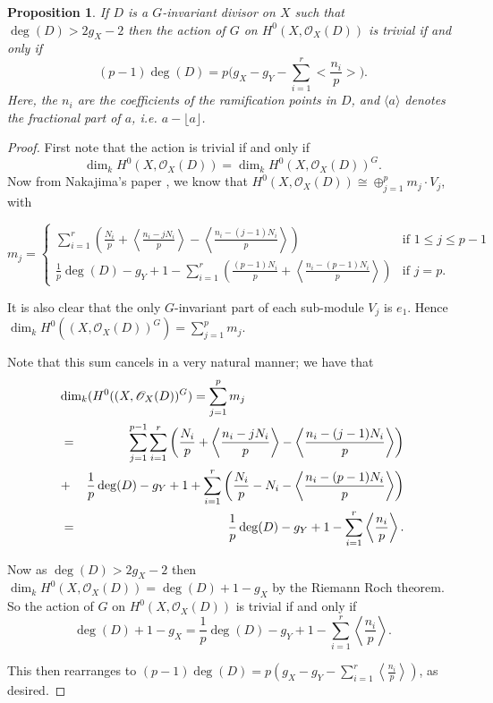 \documentclass[11pt]{article} %
\newtheorem{prop}{Proposition}
\begin{document}
  \begin{prop}\label{nakaj}
    If $D$ is a $G$-invariant divisor on $X$ such that $\deg(D)>2g_X-2$ then the action of $G$ on $H^0(X,\mathscr{O}_X(D))$ is trivial if and only if
      \[ 
	(p-1)\deg(D)=p\Big(g_X-g_Y-\sum_{i=1}^r\Big<\frac{n_i}{p}\Big>\Big).
      \]
    Here, the $n_i$ are the coefficients of the ramification points in $D$, and $\langle a \rangle$ denotes the fractional part of $a$, i.e. $a-\lfloor a \rfloor$.
  \end{prop}
  \begin{proof}
    First note that the action is trivial if and only if
      \[
	\dim_k H^0(X,\mathscr{O}_X(D))=\dim_k H^0(X,\mathscr{O}_X(D))^G.
      \]
    Now from Nakajima's paper \cite{Na}, we know that $H^0(X,\mathscr{O}_X(D))\cong \oplus _{j=1}^p m_j\cdot V_j$, with 

      \begin{equation*}
      m_j=
	\begin{cases}
	    \sum_{i=1}^r\left(\frac{N_i}{p}+\left\langle \frac{n_i-jN_i}{p}\right\rangle -\left\langle \frac{n_i-(j-1)N_i}{p}\right\rangle \right) & \mbox{if }1\leq j\leq p-1 \\
	    \frac{1}{p}\deg(D)-g_Y+1-\sum_{i=1}^r\left(\frac{(p-1)N_i}{p}+\left\langle \frac{n_i-(p-1)N_i}{p}\right\rangle \right) & \mbox{if }j=p.
	\end{cases}
      \end{equation*}

	
    It is also clear that the only $G$-invariant part of each sub-module $V_j$ is $e_1$. 
    Hence $\dim_kH^0((X,\mathscr{O}_X(D))^G) = \sum_{j=1}^p m_j$.

    Note that this sum cancels in a very natural manner; we have that
      \begin{eqnarray*}
	\lefteqn{\dim_k(H^0((X,\mathscr{O}_X(D))^G) = \sum_{j=1}^p m_j} \\
	& = & \sum_{j=1}^{p-1}  \sum_{i=1}^r\left(\frac{N_i}{p}+\left\langle\frac{n_i-jN_i}{p}\right\rangle-\left\langle\frac{n_i-(j-1)N_i}{p}\right\rangle\right) \\
	& + & \frac{1}{p}\deg(D)-g_Y+1+\sum_{i=1}^r\left(\frac{N_i}{p}-N_i-\left\langle\frac{n_i-(p-1)N_i}{p}\right\rangle\right) \\
	& = & \frac{1}{p}\deg(D)-g_Y+1-\sum_{i=1}^r \left\langle\frac{n_i}{p}\right\rangle.
      \end{eqnarray*}

    Now as $\deg(D)>2g_X-2$ then $\dim_kH^0(X,\mathscr{O}_X(D)) =\deg(D)+1-g_X$ by the Riemann Roch theorem. 
    So the action of $G$ on $H^0(X,\mathscr{O}_X(D))$ is trivial if and only if
      \begin{equation*}
	\deg(D)+1-g_X  = \frac{1}{p}\deg(D)-g_Y+1-\sum_{i=1}^r\left\langle\frac{n_i}{p}\right\rangle. \label{hi}
      \end{equation*}

    This then rearranges to $(p-1)\deg(D)=p\left(g_X-g_Y-\sum_{i=1}^r\left\langle\frac{n_i}{p}\right\rangle\right)$, as desired.
    \end{proof}
\end{document}
